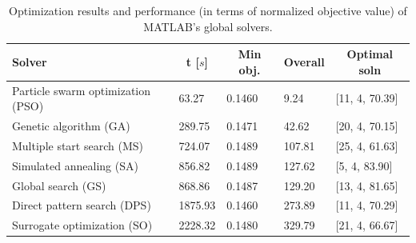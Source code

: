 \documentclass[final,3p,times]{elsarticle}
\begin{document}
\begin{table}[htbp]
\centering
\begin{tabular}{p{5cm} p{1.25cm} p{0.5cm} p{0.5cm} p{2cm}}
\toprule
\multicolumn{1}{l}{\textbf{Solver}} & \multicolumn{1}{c}{\textbf{t [$s$]}} & \multicolumn{1}{c}{\textbf{Min obj.}} & \multicolumn{1}{c}{\textbf{Overall}} & \multicolumn{1}{c}{\textbf{Optimal soln}} \\ \midrule
Particle swarm optimization (PSO) &  63.27  &  0.1460  & 9.24 & [11,    4,   70.39]\\
Genetic algorithm (GA)  &  289.75  &  0.1471  & 42.62 &  [20,    4,   70.15] \\
Multiple start search (MS) & 724.07 & 0.1489 & 107.81 & [25,    4,   61.63] \\
Simulated annealing (SA) & 856.82 & 0.1489 & 127.62 & [5,    4,   83.90] \\
Global search (GS) & 868.86 & 0.1487 & 129.20 & [13,    4,   81.65] \\
Direct pattern search (DPS) & 1875.93 & 0.1460 & 273.89 & [11,    4,   70.29] \\
Surrogate optimization (SO) & 2228.32 & 0.1480 & 329.79 & [21,    4,   66.67] \\
\bottomrule
\end{tabular}
\caption{\label{tab:solver_comp} Optimization results and performance (in terms of normalized objective value) of MATLAB's global solvers.} 
\end{table}
\end{document}
